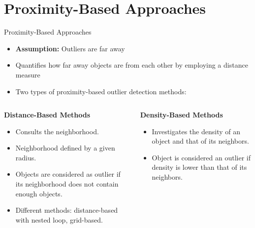 \section{Proximity-Based Approaches}


\begin{frame}{Proximity-Based Approaches}
	\begin{itemize}
		\item \textbf{Assumption:} Outliers are far away
		\item Quantifies how far away objects are from each other by employing a distance measure
		\item Two types of proximity-based outlier detection methods:
	\end{itemize}

	\begin{columns}
		\begin{column}{0.55\textwidth}
			\begin{center}
				\textbf{Distance-Based Methods}
			\end{center}
			\begin{itemize}
				\item Consults the neighborhood.
				\item Neighborhood defined by a given radius.
				\item Objects are considered as outlier if its neighborhood does not contain enough objects.
				\item Different methods: distance-based with nested loop, grid-based.
			\end{itemize}
		\end{column}

		\begin{column}{0.45\textwidth}
			\begin{center}
				\textbf{Density-Based Methods}
			\end{center}
			\begin{itemize}
				\item Investigates the density of an object and that of its neighbors.
				\item Object is considered an outlier if density is lower than that of its neighbors.
			\end{itemize}
		\end{column}
	\end{columns}
\end{frame}


